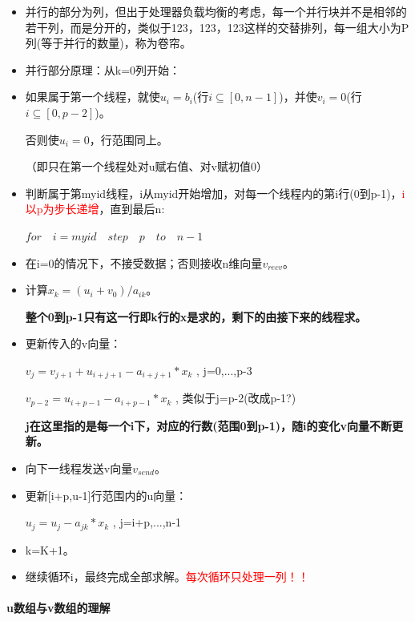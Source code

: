 \documentclass[UTF8]{article}%
\begin{document}
\begin{itemize}
    \item 并行的部分为列，但出于处理器负载均衡的考虑，每一个并行块并不是相邻的若干列，而是分开的，类似于123，123，123这样的交替排列，每一组大小为P列(等于并行的数量)，称为卷帘。
    \item 并行部分原理：从k=0列开始：
    \item 如果属于第一个线程，就使$u_i=b_i$(行$i\subseteq [0,n-1]$)，并使$v_i=0$(行$i\subseteq [0,p-2]$)。
    
    否则使$u_i=0$，行范围同上。
    
    （即只在第一个线程处对u赋右值、对v赋初值0）

    \item 判断属于第myid线程，i从myid开始增加，对每一个线程内的第i行(0到p-1)，\textcolor{red}{i以p为步长递增}，直到最后n:
    
    $for \quad i=myid \quad step \quad p \quad to \quad n-1 $

    \item 在i=0的情况下，不接受数据；否则接收n维向量$v_{recv}$。
    \item 计算$x_k=(u_i+v_0)/a_{ik}$。
    
    \textbf{整个0到p-1只有这一行即k行的x是求的，剩下的由接下来的线程求。}

    \item 更新传入的v向量：
    
    $v_j=v_{j+1}+u_{i+j+1}-a_{i+j+1}*x_k$ , j=0,...,p-3

    $v_{p-2}=u_{i+p-1}-a_{i+p-1}*x_k$ , 类似于j=p-2(改成p-1?)

    \textbf{j在这里指的是每一个i下，对应的行数(范围0到p-1)，随i的变化v向量不断更新。}

    \item 向下一线程发送v向量$v_{send}$。
    \item 更新[i+p,u-1]行范围内的u向量：
    
    $u_j=u_j-a_{jk}*x_k$ , j=i+p,...,n-1

    \item k=K+1。
    \item 继续循环i，最终完成全部求解。\textcolor{red}{每次循环只处理一列！！}
\end{itemize}    

\paragraph{u数组与v数组的理解}~{}
\end{document}
